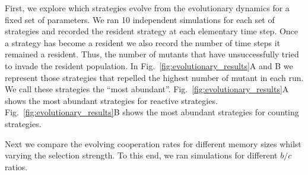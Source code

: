 \documentclass{article}
\theoremstyle{definition}
\begin{document}
First, we explore which strategies evolve from the evolutionary dynamics for a
fixed set of parameters. We ran 10 independent simulations for each set of
strategies and recorded the resident strategy at each elementary time step. Once
a strategy has become a resident we also record the number of time steps it
remained a resident. Thus, the number of mutants that have unsuccessfully tried
to invade the resident population. In Fig.~\ref{fig:evolutionary_results}A and B
we represent those strategies that repelled the highest number of mutant in each
run. We call these strategies the ``most abundant''.
Fig.~\ref{fig:evolutionary_results}A shows the most abundant strategies for
reactive strategies.
Fig.~\ref{fig:evolutionary_results}B shows the most abundant strategies for
counting strategies.

Next we compare the evolving cooperation rates for different memory sizes whilst
varying the selection strength. To this end, we ran simulations for different
$b/c$ ratios.
\end{document}
